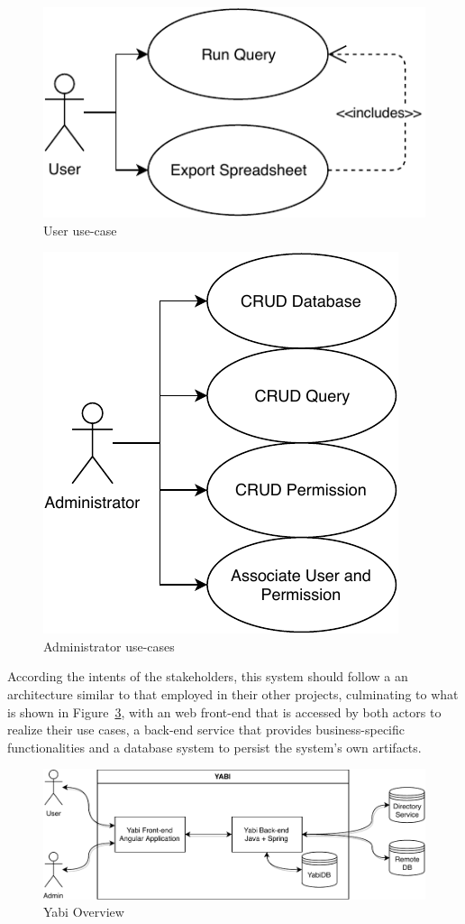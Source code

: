 \begin{figure}
  \centering
  \includegraphics[width=.5\textwidth]{images/diagramas/userusecase}
  \caption{User use-case}\label{fig:userusecase}
\end{figure}

\begin{figure}
  \centering
  \includegraphics[width=.5\textwidth]{images/diagramas/adminusecase}
  \caption{Administrator use-cases}\label{fig:adminusecases}
\end{figure}

According the intents of the stakeholders, this system should follow a an architecture similar to that employed in their other projects, culminating to what is shown in Figure~\ref{fig:overview}, with an web front-end that is accessed by both actors to realize their use cases, a back-end service that provides business-specific functionalities and a database system to persist the system's own artifacts.

\begin{figure}
  \centering
  \includegraphics[width=\textwidth]{images/diagramas/overview.pdf}
  \caption{Yabi Overview}\label{fig:overview}
\end{figure}


